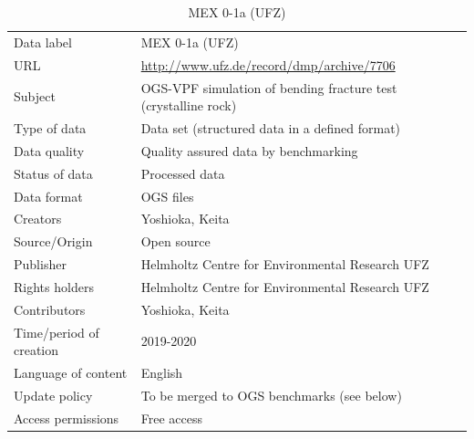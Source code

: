 \begin{table}[!ht]
\caption{MEX 0-1a (UFZ)}
\label{tab:dms-mex0-1a-ufz}
\small
\begin{tabular}{R{3.5cm}|L{7.5cm}}
\hline
%
Data label & MEX 0-1a (UFZ) \\
URL & \url{http://www.ufz.de/record/dmp/archive/7706} \\ 
Subject  & OGS-VPF simulation of bending fracture test (crystalline rock) \\
Type of data  & Data set (structured data in a defined format) \\
Data quality  & Quality assured data by benchmarking \\
Status of data  & Processed data \\
Data format  & OGS files \\
Creators  & Yoshioka, Keita  \\
Source/Origin & Open source \\
Publisher  & Helmholtz Centre for Environmental Research UFZ \\
Rights holders & Helmholtz Centre for Environmental Research UFZ \\
Contributors & Yoshioka, Keita \\
Time/period of creation & 2019-2020 \\
Language of content & English \\
Update policy & To be merged to OGS benchmarks (see below) \\
Access permissions & Free access \\
%
\hline
\end{tabular}
\end{table}

